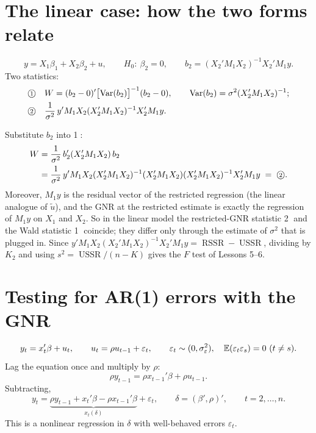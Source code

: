 \documentclass[11pt]{article}
\begin{document}
\section{The linear case: how the two forms relate}

\[ y=X_{1}\beta_{1}+X_{2}\beta_{2}+u, \qquad H_{0}:\ \beta_{2}=0,
   \qquad b_{2}=(X_{2}'M_{1}X_{2})^{-1}X_{2}'M_{1}y. \]
Two statistics:
\begin{align*}
 &\text{\textcircled{\scriptsize 1}}\quad
   W=(b_{2}-0)'\bigl[\operatorname{Var}(b_{2})\bigr]^{-1}(b_{2}-0),
   \qquad \operatorname{Var}(b_{2})=\sigma^{2}(X_{2}'M_{1}X_{2})^{-1};\\
 &\text{\textcircled{\scriptsize 2}}\quad
   \frac{1}{\sigma^{2}}\,y'M_{1}X_{2}(X_{2}'M_{1}X_{2})^{-1}X_{2}'M_{1}y .
\end{align*}

Substitute $b_{2}$ into \textcircled{\scriptsize 1}:
\begin{align*}
 W &=\frac{1}{\sigma^{2}}\,b_{2}'(X_{2}'M_{1}X_{2})\,b_{2}\\
   &=\frac{1}{\sigma^{2}}\,y'M_{1}X_{2}(X_{2}'M_{1}X_{2})^{-1}
      (X_{2}'M_{1}X_{2})(X_{2}'M_{1}X_{2})^{-1}X_{2}'M_{1}y
   \;=\;\text{\textcircled{\scriptsize 2}}.
\end{align*}
Moreover, $M_{1}y$ is the residual vector of the restricted regression
(the linear analogue of $\tilde u$), and the GNR at the restricted estimate is
exactly the regression of $M_{1}y$ on $X_{1}$ and $X_{2}$. So in the linear model the
restricted-GNR statistic \textcircled{\scriptsize 2} and the Wald statistic
\textcircled{\scriptsize 1} coincide; they differ only through the estimate of
$\sigma^{2}$ that is plugged in. Since
$y'M_{1}X_{2}(X_{2}'M_{1}X_{2})^{-1}X_{2}'M_{1}y=\operatorname{RSSR}-\operatorname{USSR}$,
dividing by $K_{2}$ and using $s^{2}=\operatorname{USSR}/(n-K)$ gives the $F$ test of
Lessons 5--6.

\section{Testing for AR(1) errors with the GNR}

\[ y_{t}=x_{t}'\beta+u_{t}, \qquad u_{t}=\rho u_{t-1}+\varepsilon_{t}, \qquad
   \varepsilon_{t}\sim(0,\sigma_{\varepsilon}^{2}),\quad
   \mathbb{E}(\varepsilon_{t}\varepsilon_{s})=0\ (t\neq s). \]
Lag the equation once and multiply by $\rho$:
\[ \rho y_{t-1}=\rho x_{t-1}'\beta+\rho u_{t-1}. \]
Subtracting,
\[ y_{t}=\underbrace{\rho y_{t-1}+x_{t}'\beta-\rho x_{t-1}'\beta}_{x_{t}(\delta)}
   +\varepsilon_{t}, \qquad \delta=(\beta',\rho)', \qquad t=2,\ldots,n. \]
This is a nonlinear regression in $\delta$ with well-behaved errors $\varepsilon_{t}$.
\end{document}
